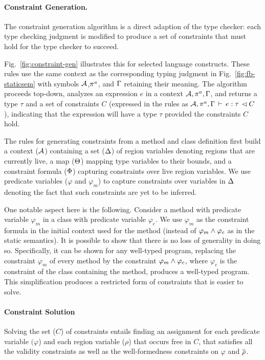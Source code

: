 

\paragraph{Constraint Generation.}
The constraint generation algorithm is a direct adaption of the type checker:
each type checking judgment is modified to produce a set of constraints that must hold
for the type checker to succeed.

Fig.~\ref{fig:constraint-gen} illustrates this for selected language constructs.
These rules use the same context as the corresponding typing judgment in
Fig.~\ref{fig:fb-staticsem} with symbols ${\mathcal{A}}$,$\pi^a$, and $\Gamma$
retaining their meaning.
The algorithm proceeds top-down, analyzes an expression $e$ in a context
${\mathcal{A}},\pi^a,\Gamma$, and returns a type $\tau$ and a set of constraints $C$
(expressed in the rules as ${{\mathcal{A}},\pi^a,\Gamma} \, \vdash \, {e} : {\tau} \, \lhd {C}$ ),
indicating that the expression will have a type $\tau$ provided the constraints $C$ hold.

The rules for generating constraints from a method and
class definition first build a context (${\mathcal{A}}$) containing a set ($ \Delta$) of region variables denoting
regions that are currently live, a map ($\Theta$) mapping type
variables to their bounds, and a constraint formula ($\Phi$)
capturing constraints over live region variables. We use predicate
variables ($\varphi$ and $\varphi_m$) to capture constraints over
variables in $\Delta$ denoting the fact that such constraints are yet
to be inferred.

One notable aspect here is the following. Consider a method with predicate
variable $\varphi_m$ in a class with predicate variable $\varphi_c$. 
We use $\varphi_m$ as the constraint formula in the initial context used for
the method (instead of $\varphi_m \wedge \varphi_c$ as in the static semantics).
It is possible to show that there is no loss of generality in doing so.
Specifically, it can be shown for any well-typed program, replacing the constraint
$\varphi_m$ of every method by the constraint $\varphi_m \wedge \varphi_c$,
where $\varphi_c$ is the constraint of the class containing the method,
produces a well-typed program.
%
This simplification produces a restricted form of constraints that is easier to solve.

\paragraph{Constraint Solution}
Solving the set ($C$) of constraints entails finding an
assignment for each predicate variable $(\varphi$) and each region
variable ($\rho$) that occurs free in $C$, that satisfies all
the validity constraints as well as the well-formedness constraints on
$\varphi$ and $\overline{\rho}$.

